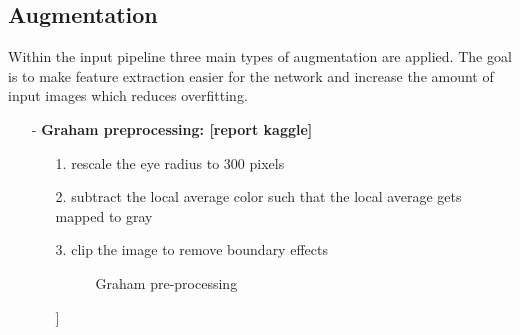 \documentclass{article}
\begin{document}
\subsection{Augmentation}
Within the input pipeline three main types of augmentation are applied.
The goal is to make feature extraction easier for the network and increase the amount of input images which reduces overfitting.
\begin{itemize}
  \item[-] \textbf{Graham preprocessing:  [report kaggle]} \begin{itemize}
    \item[1.] rescale the eye radius to 300 pixels 
    \item[2.] subtract the local average color such that the local average gets mapped to gray
    \item[3.] clip the image to remove boundary effects
    \begin{figure}[h]
      \centering
      \hspace{0.5cm}
      \caption{Graham pre-processing}
    \end{figure}] 

\end{itemize}
\end{itemize}
\end{document}
